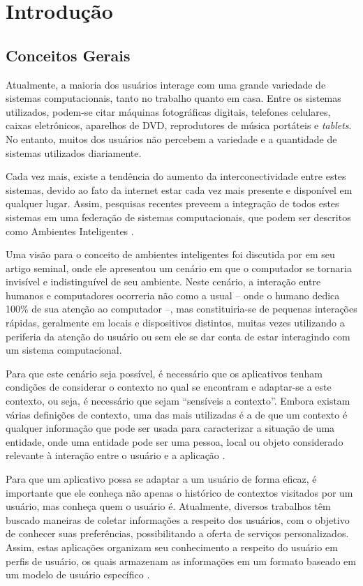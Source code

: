 \chapter{Introdução}
\label{ch:introducao}

\section{Conceitos Gerais}
\label{sec:conceitos}

Atualmente, a maioria dos usuários interage com uma grande variedade de sistemas computacionais, tanto no trabalho quanto em casa. Entre os sistemas utilizados, podem-se citar máquinas fotográficas digitais, telefones celulares, caixas eletrônicos, aparelhos de DVD, reprodutores de música portáteis e {\em tablets}. No entanto, muitos dos usuários não percebem a variedade e a quantidade de sistemas utilizados diariamente.

Cada vez mais, existe a tendência do aumento da interconectividade entre estes sistemas, devido ao fato da internet estar cada vez mais presente e disponível em qualquer lugar. Assim, pesquisas recentes preveem a integração de todos estes sistemas em uma federação de sistemas computacionais, que podem ser descritos como Ambientes Inteligentes \cite{heckmann05}.

Uma visão para o conceito de ambientes inteligentes foi discutida por  em seu artigo seminal, onde ele apresentou um cenário em que o computador se tornaria invisível e indistinguível de seu ambiente. Neste cenário, a interação entre humanos e computadores ocorreria não como a usual -- onde o humano dedica 100\% de sua atenção ao computador --, mas constituiria-se de pequenas interações rápidas, geralmente em locais e dispositivos distintos, muitas vezes utilizando a periferia da atenção do usuário \cite{weiser96} ou sem ele se dar conta de estar interagindo com um sistema computacional.

Para que este cenário seja possível, é necessário que os aplicativos tenham condições de considerar o contexto no qual se encontram e adaptar-se a este contexto, ou seja, é necessário que sejam ``sensíveis a contexto''. Embora existam várias definições de contexto, uma das mais utilizadas é a de que um contexto é qualquer informação que pode ser usada para caracterizar a situação de uma entidade, onde uma entidade pode ser uma pessoa, local ou objeto considerado relevante à interação entre o usuário e a aplicação \cite{dey2001}.

Para que um aplicativo possa se adaptar a um usuário de forma eficaz, é importante que ele conheça não apenas o histórico de contextos visitados por um usuário, mas conheça quem o usuário é. Atualmente, diversos trabalhos têm buscado maneiras de coletar informações a respeito dos usuários, com o objetivo de conhecer suas preferências, possibilitando a oferta de serviços personalizados. Assim, estas aplicações organizam seu conhecimento a respeito do usuário em perfis de usuário, os quais armazenam as informações em um formato baseado em um modelo de usuário específico \cite{viviani10}.

